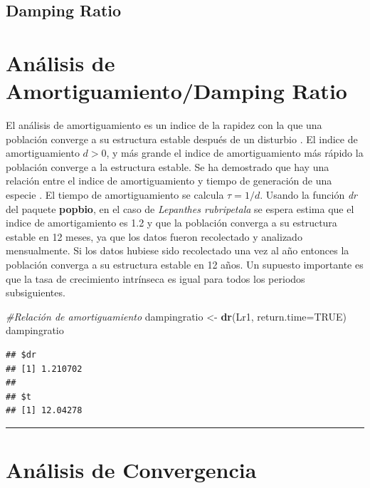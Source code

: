 \documentclass[
]{book}
\newenvironment{Shaded}{\begin{snugshade}}{\end{snugshade}}
\newcommand{\AttributeTok}[1]{\textcolor[rgb]{0.13,0.29,0.53}{#1}}
\newcommand{\CommentTok}[1]{\textcolor[rgb]{0.56,0.35,0.01}{\textit{#1}}}
\newcommand{\ConstantTok}[1]{\textcolor[rgb]{0.56,0.35,0.01}{#1}}
\newcommand{\FunctionTok}[1]{\textcolor[rgb]{0.13,0.29,0.53}{\textbf{#1}}}
\newcommand{\NormalTok}[1]{#1}
\newcommand{\OtherTok}[1]{\textcolor[rgb]{0.56,0.35,0.01}{#1}}
\theoremstyle{definition}
\theoremstyle{definition}
\theoremstyle{definition}
\theoremstyle{definition}
\theoremstyle{remark}
\begin{document}
\subsection{Damping Ratio}\label{damping-ratio}

\section{Análisis de Amortiguamiento/Damping Ratio}\label{anuxe1lisis-de-amortiguamientodamping-ratio}

El análisis de amortiguamiento es un indice de la rapidez con la que una población converge a su estructura estable después de un disturbio \citep{jiang2020life}. El indice de amortiguamiento \(d > 0\), y más grande el indice de amortiguamiento más rápido la población converge a la estructura estable. Se ha demostrado que hay una relación entre el indice de amortiguamiento y tiempo de generación de una especie \citep{jiang2020life}. El tiempo de amortiguamiento se calcula \(\tau=1/d\). Usando la función \emph{dr} del paquete \textbf{popbio}, en el caso de \emph{Lepanthes rubripetala} se espera estima que el indice de amortigamiento es 1.2 y que la población converga a su estructura estable en 12 meses, ya que los datos fueron recolectado y analizado mensualmente. Si los datos hubiese sido recolectado una vez al año entonces la población converga a su estructura estable en 12 años. Un supuesto importante es que la tasa de crecimiento intrínseca es igual para todos los periodos subsiguientes.

\begin{Shaded}
\begin{Highlighting}[]
\CommentTok{\#Relación de amortiguamiento}
\NormalTok{dampingratio }\OtherTok{\textless{}{-}} \FunctionTok{dr}\NormalTok{(Lr1, }\AttributeTok{return.time=}\ConstantTok{TRUE}\NormalTok{)}
\NormalTok{dampingratio}
\end{Highlighting}
\end{Shaded}

\begin{verbatim}
## $dr
## [1] 1.210702
## 
## $t
## [1] 12.04278
\end{verbatim}

\begin{center}\rule{0.5\linewidth}{0.5pt}\end{center}

\section{Análisis de Convergencia}\label{anuxe1lisis-de-convergencia}
\end{document}
